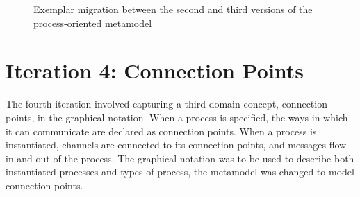 \begin{figure}[htbp]
	\centering
	\caption{Exemplar migration between the second and third versions of the process-oriented metamodel}
\end{figure}

\clearpage


\section{Iteration 4: Connection Points}
The fourth iteration involved capturing a third domain concept, connection points, in the graphical notation. When a process is specified, the ways in which it can communicate are declared as connection points. When a process is instantiated, channels are connected to its connection points, and messages flow in and out of the process. The graphical notation was to be used to describe both instantiated processes and types of process, the metamodel was changed to model connection points.

